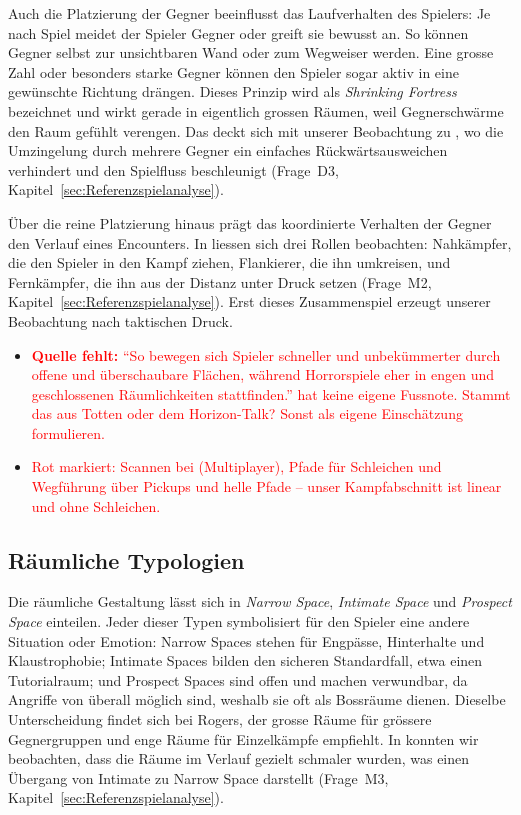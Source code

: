 \documentclass[../Main.tex]{subfiles}
\begin{document}
Auch die Platzierung der Gegner beeinflusst das Laufverhalten des Spielers: Je nach Spiel meidet der Spieler Gegner oder greift sie bewusst an. So können Gegner selbst zur unsichtbaren Wand oder zum Wegweiser werden.\autocite{totten2014architectural} Eine grosse Zahl oder besonders starke Gegner können den Spieler sogar aktiv in eine gewünschte Richtung drängen. Dieses Prinzip wird als \textit{Shrinking Fortress} bezeichnet und wirkt gerade in eigentlich grossen Räumen, weil Gegnerschwärme den Raum gefühlt verengen.\autocite{totten2014architectural} Das deckt sich mit unserer Beobachtung zu , wo die Umzingelung durch mehrere Gegner ein einfaches Rückwärtsausweichen verhindert und den Spielfluss beschleunigt (Frage~D3, Kapitel~\ref{sec:Referenzspielanalyse}).

Über die reine Platzierung hinaus prägt das koordinierte Verhalten der Gegner den Verlauf eines Encounters. In  liessen sich drei Rollen beobachten: Nahkämpfer, die den Spieler in den Kampf ziehen, Flankierer, die ihn umkreisen, und Fernkämpfer, die ihn aus der Distanz unter Druck setzen (Frage~M2, Kapitel~\ref{sec:Referenzspielanalyse}). Erst dieses Zusammenspiel erzeugt unserer Beobachtung nach taktischen Druck.

\begin{itemize}[leftmargin=1.5cm]
    \item \textcolor{red}{\textbf{Quelle fehlt:} \enquote{So bewegen sich Spieler schneller und unbekümmerter durch offene und überschaubare Flächen, während Horrorspiele eher in engen und geschlossenen Räumlichkeiten stattfinden.} hat keine eigene Fussnote. Stammt das aus Totten oder dem Horizon-Talk? Sonst als eigene Einschätzung formulieren.}
    \item \textcolor{red}{Rot markiert: Scannen bei  (Multiplayer), Pfade für Schleichen und Wegführung über Pickups und helle Pfade -- unser Kampfabschnitt ist linear und ohne Schleichen.}
\end{itemize}

\subsection{Räumliche Typologien} \label{sec:Raumtypologien}
Die räumliche Gestaltung lässt sich in \textit{Narrow Space}, \textit{Intimate Space} und \textit{Prospect Space} einteilen. Jeder dieser Typen symbolisiert für den Spieler eine andere Situation oder Emotion: Narrow Spaces stehen für Engpässe, Hinterhalte und Klaustrophobie; Intimate Spaces bilden den sicheren Standardfall, etwa einen Tutorialraum; und Prospect Spaces sind offen und machen verwundbar, da Angriffe von überall möglich sind, weshalb sie oft als Bossräume dienen.\autocite{totten2014architectural} Dieselbe Unterscheidung findet sich bei Rogers, der grosse Räume für grössere Gegnergruppen und enge Räume für Einzelkämpfe empfiehlt.\autocite{rogers2014levelup} In  konnten wir beobachten, dass die Räume im Verlauf gezielt schmaler wurden, was einen Übergang von Intimate zu Narrow Space darstellt (Frage~M3, Kapitel~\ref{sec:Referenzspielanalyse}).
\end{document}
